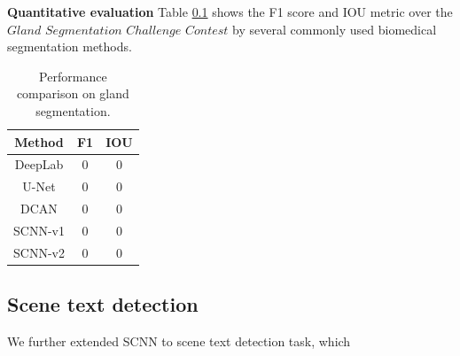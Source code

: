 \textbf{Quantitative evaluation}
Table \ref{} shows the F1 score and IOU metric over the $Gland$ $Segmentation$ $Challenge$ $Contest$ by several commonly used biomedical segmentation methods.

\begin{table}
	\centering
	\caption{Performance comparison on gland segmentation.}
	\begin{tabular}{c|cc}
		\hline
		Method & F1 & IOU \\
		\hline
		DeepLab & 0 & 0 \\
		U-Net & 0 & 0 \\
		DCAN & 0 & 0 \\
		SCNN-v1 & 0 & 0 \\
		SCNN-v2 & 0 & 0 \\
		\hline
	\end{tabular}
\end{table}


\subsection{Scene text detection}
We further extended SCNN to scene text detection task, which
